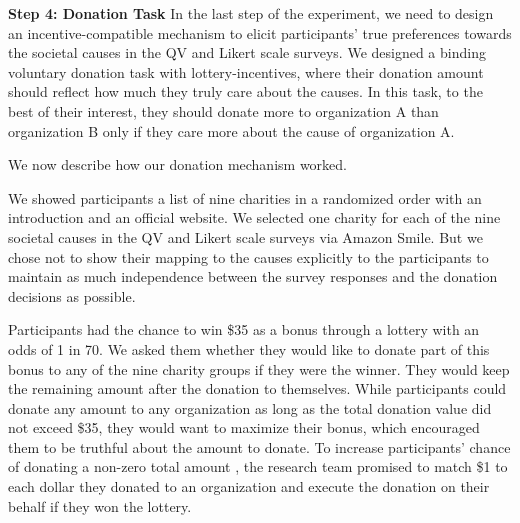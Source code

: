 \textbf{Step 4: Donation Task} In the last step of the experiment, we need to design an incentive-compatible mechanism to elicit participants' true preferences towards the societal causes in the QV and Likert scale surveys. We designed a binding voluntary donation task with lottery-incentives, where their donation amount should reflect how much they truly care about the causes. In this task, to the best of their interest, they should donate more to organization A than organization B only if they care more about the cause of organization A. 

 We now describe how our donation mechanism worked.

We showed participants a list of nine charities in a randomized order with an introduction and an official website. We selected one charity for each of the nine societal causes in the QV and Likert scale surveys via Amazon Smile. But we chose not to show their mapping to the causes explicitly to the participants to maintain as much independence between the survey responses and the donation decisions as possible. 

Participants had the chance to win \$35 as a bonus through a lottery with an odds of 1 in 70. We asked them whether they would like to donate part of this bonus to any of the nine charity groups if they were the winner. They would keep the remaining amount after the donation to themselves. While participants could donate any amount to any organization as long as the total donation value did not exceed \$35, they would want to maximize their bonus, which encouraged them to be truthful about the amount to donate. To increase participants' chance of donating a non-zero total amount \cite{meier2007subsidies}, the research team promised to match \$1 to each dollar they donated to an organization and execute the donation on their behalf if they won the lottery. 

